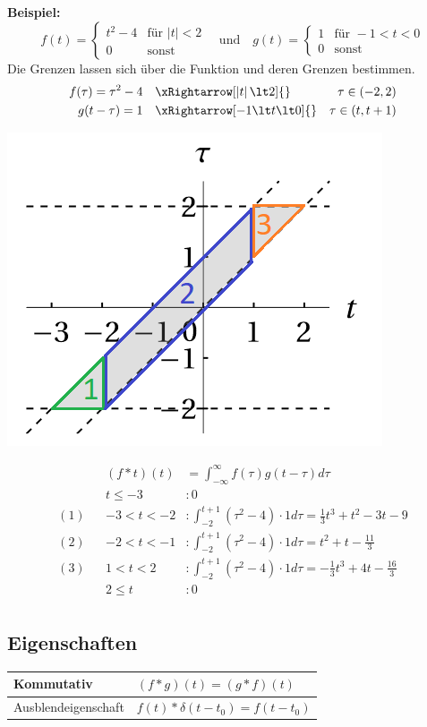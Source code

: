 \noindent\textbf{Beispiel:} 
\[
f(t) = \begin{cases}
	t^2 - 4 & \text{für } \left|t\right| \lt 2 \\
	0 & \text{sonst}
\end{cases}
\quad \text{und} \quad 
g(t) = \begin{cases}
	1 & \text{für } -1 \lt t \lt 0 \\
	0 & \text{sonst}
\end{cases}
\]
Die Grenzen lassen sich über die Funktion und deren Grenzen bestimmen.
\begin{align*}
	f(\tau) = \tau^2 - 4 &\quad \xRightarrow[\left|t\right| \lt 2]{}& \tau \in (-2,2)\\
	g(t-\tau)= 1 &\quad \xRightarrow[-1 \lt t \lt 0]{}& \tau\in (t, t +1)
\end{align*}
\begin{center}
	\includegraphics[width=0.4\columnwidth]{Images/faltprodukt}
\end{center}

\begin{align*}
	&& (f*t)(t) &= \int_{-\infty}^{\infty}f(\tau)g(t -\tau)d\tau \\
	&& t \leq -3       &: 0 \\
	(1) && -3 \lt t \lt -2 &: \int_{-2}^{t+1}(\tau^2 -4)\cdot 1d\tau = \frac{1}{3}t^3 + t^2 - 3t -9\\
	(2) && -2 \lt t \lt -1 &: \int_{-2}^{t+1}(\tau^2 -4)\cdot 1d\tau = t^2 + t - \frac{11}{3}\\
	(3) && 1 \lt t \lt 2   &: \int_{-2}^{t+1}(\tau^2 -4)\cdot 1d\tau = -\frac{1}{3}t^3 + 4t - \frac{16}{3}\\
	&& 2 \leq t &: 0 \\	
\end{align*}


\subsection{Eigenschaften}
	\begin{center}
		\begin{tabular}{l|l}
		Kommutativ & $(f * g)(t) = (g*f)(t)$ \\ \midrule
		Ausblendeigenschaft & $f(t)*\delta(t-t_0)=f(t-t_0)$
	\end{tabular}
\end{center}
